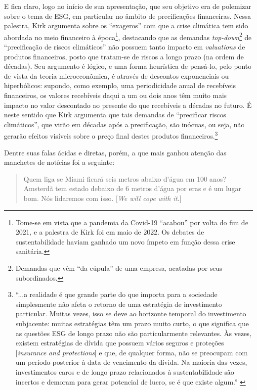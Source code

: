 \documentclass[12pt]{article}
\numberwithin{equation}{section}
\theoremstyle{plain}
\theoremstyle{definition}
\theoremstyle{remark}
\begin{document}
E fica claro, logo no início de sua apresentação, que seu objetivo era de polemizar sobre o tema de ESG, em particular no âmbito de precificações financeiras. Nessa palestra, Kirk argumenta sobre os ``exageros'' com que a crise climática tem sido abordada no meio financeiro à época\footnote{Tome-se em vista que a pandemia da Covid-19 ``acabou'' por volta do fim de 2021, e a palestra de Kirk foi em maio de 2022. Os debates de sustentabilidade haviam ganhado um novo ímpeto em função dessa crise sanitária.}, destacando que as demandas \textit{top-down}\footnote{Demandas que vêm ``da cúpula'' de uma empresa, acatadas por seus subordinados.} de ``precificação de riscos climáticos'' não possuem tanto impacto em \textit{valuations} de produtos financeiros, posto que tratam-se de riscos a longo prazo (na ordem de décadas). Seu argumento é lógico, e uma forma heurística de pensá-lo, pelo ponto de vista da teoria microeconômica, é através de descontos exponenciais ou hiperbólicos: supondo, como exemplo, uma periodicidade anual de recebíveis financeiros, os valores recebíveis daqui a um ou dois anos têm muito mais impacto no valor descontado ao presente do que recebíveis a décadas no futuro. É neste sentido que Kirk argumenta que tais demandas de ``precificar riscos climáticos'', que virão em décadas após a precificação, são inócuas, ou seja, não gerarão efeitos visíveis sobre o preço final destes produtos financeiros.\footnote{``...a realidade é que grande parte do que importa para a sociedade simplesmente não afeta o retorno de uma estratégia de investimento particular. Muitas vezes, isso se deve ao horizonte temporal do investimento subjacente: muitas estratégias têm um prazo muito curto, o que significa que as questões ESG de longo prazo não são particularmente relevantes. Às vezes, existem estratégias de dívida que possuem vários seguros e proteções [\textit{insurance and protections}] e que, de qualquer forma, não se preocupam com um período posterior à data de vencimento da dívida. Na maioria das vezes, investimentos caros e de longo prazo relacionados à sustentabilidade são incertos e demoram para gerar potencial de lucro, se é que existe algum.'' \cite[p. 15]{Fancy2021}}

Dentre suas falas ácidas e diretas, porém, a que mais ganhou atenção das manchetes de notícias foi a seguinte:

\begin{quote}
Quem liga se Miami ficará seis metros abaixo d'água em 100 anos? Amsterdã tem estado debaixo de 6 metros d'água por eras e é um lugar bom. Nós lidaremos com isso. {[}\textit{We will cope with it.}{]} \parencite{Kirk2022}
\end{quote}
\end{document}
